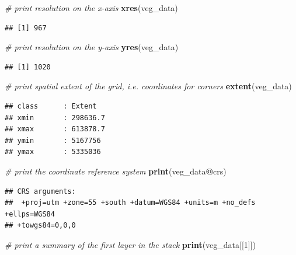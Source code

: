 \documentclass[12pt,]{book}
\newenvironment{Shaded}{\begin{snugshade}}{\end{snugshade}}
\newcommand{\KeywordTok}[1]{\textcolor[rgb]{0.13,0.29,0.53}{\textbf{#1}}}
\newcommand{\DecValTok}[1]{\textcolor[rgb]{0.00,0.00,0.81}{#1}}
\newcommand{\CommentTok}[1]{\textcolor[rgb]{0.56,0.35,0.01}{\textit{#1}}}
\newcommand{\OperatorTok}[1]{\textcolor[rgb]{0.81,0.36,0.00}{\textbf{#1}}}
\newcommand{\NormalTok}[1]{#1}
\begin{document}
\begin{Shaded}
\begin{Highlighting}[]
\CommentTok{# print  resolution on the x-axis}
\KeywordTok{xres}\NormalTok{(veg_data)}
\end{Highlighting}
\end{Shaded}

\begin{verbatim}
## [1] 967
\end{verbatim}

\begin{Shaded}
\begin{Highlighting}[]
\CommentTok{# print resolution on the y-axis}
\KeywordTok{yres}\NormalTok{(veg_data)}
\end{Highlighting}
\end{Shaded}

\begin{verbatim}
## [1] 1020
\end{verbatim}

\begin{Shaded}
\begin{Highlighting}[]
\CommentTok{# print spatial extent of the grid, i.e. coordinates for corners}
\KeywordTok{extent}\NormalTok{(veg_data)}
\end{Highlighting}
\end{Shaded}

\begin{verbatim}
## class      : Extent 
## xmin       : 298636.7 
## xmax       : 613878.7 
## ymin       : 5167756 
## ymax       : 5335036
\end{verbatim}

\begin{Shaded}
\begin{Highlighting}[]
\CommentTok{# print the coordinate reference system}
\KeywordTok{print}\NormalTok{(veg_data}\OperatorTok{@}\NormalTok{crs)}
\end{Highlighting}
\end{Shaded}

\begin{verbatim}
## CRS arguments:
##  +proj=utm +zone=55 +south +datum=WGS84 +units=m +no_defs +ellps=WGS84
## +towgs84=0,0,0
\end{verbatim}

\begin{Shaded}
\begin{Highlighting}[]
\CommentTok{# print a summary of the first layer in the stack}
\KeywordTok{print}\NormalTok{(veg_data[[}\DecValTok{1}\NormalTok{]])}
\end{Highlighting}
\end{Shaded}
\end{document}
